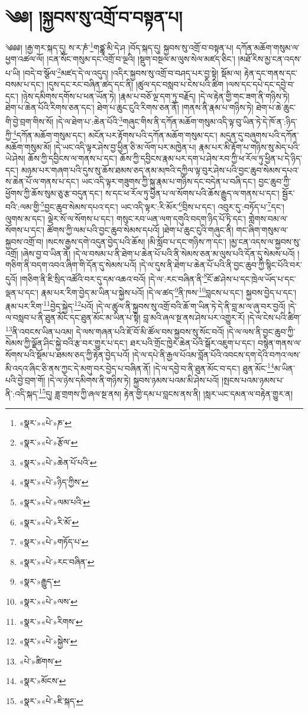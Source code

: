 \chapter{༄༅། །སྐྱབས་སུ་འགྲོ་བ་བསྟན་པ།}༄༅༅། །རྒྱ་གར་སྐད་དུ། ས་ར་ཎཾ་\footnote{«སྣར་»«པེ་»ཎ་}གཙྪཱ་མི་དེ་ཤ །བོད་སྐད་དུ། སྐྱབས་སུ་འགྲོ་བ་བསྟན་པ། དཀོན་མཆོག་གསུམ་ལ་ཕྱག་འཚལ་ལོ། །ངན་སོང་གསུམ་དང་འགྲོ་བ་ལྔའི། །སྡུག་བསྔལ་མ་ལུས་སེལ་མཛད་ཅིང་། །མཐོ་རིས་མྱ་ངན་འདས་པ་ཡི། །བདེ་བ་སྩོལ་\footnote{«སྣར་»«པེ་»རྩོལ་}མཛད་དེ་ལ་འདུད། །འདིར་སྐྱབས་སུ་འགྲོ་བ་བཤད་པར་བྱ་སྟེ། སྡོམ་ལ། རྟེན་དང་གནས་དང་བསམ་པ་དང་། །དུས་དང་རང་བཞིན་ཚད་དང་ནི། །ཚུལ་དང་བསླབ་པ་ངེས་པའི་ཚིག །ལས་དང་དཔེ་དང་དབྱེ་བ་དང་། །ཉེས་དམིགས་དགོས་པ་ཕན་ཡོན་ཏེ། །རྣམ་པ་བཅོ་ལྔ་དག་ཏུ་བརྗོད། །དེ་ལ་རྟེན་གྱི་གང་ཟག་ནི་གཉིས་ཏེ། ཐེག་པ་ཆེན་པོའི་རིགས་ཅན་དང་། ཐེག་པ་ཆུང་ངུའི་རིགས་ཅན་ནོ། །གནས་ནི་རྣམ་པ་གཉིས་ཏེ། ཐེག་པ་ཆེ་ཆུང་གི་བྱེ་བྲག་གིས་སོ། །དེ་ལ་ཐེག་པ་:ཆེན་པོའི་\footnote{«སྣར་»«པེ་»ཆེན་པོ་པའི་}གཞུང་གིས་ནི་དཀོན་མཆོག་གསུམ་འདི་ལྟ་བུ་ཡིན་ཏེ་དེ་ཁོ་ན་:ཉིད་ཀྱི་\footnote{«སྣར་»«པེ་»ཉིད་ཀྱིས་}དཀོན་མཆོག་གསུམ་དང་། མངོན་པར་རྟོགས་པའི་དཀོན་མཆོག་གསུམ་དང་། མདུན་དུ་བཞུགས་པའི་དཀོན་མཆོག་གསུམ་མོ། །དེ་ཡང་འདི་ལྟར་ཤེས་བྱ་ཕྱིན་ཅི་མ་ལོག་པར་མཁྱེན་པ། རྣམ་པར་མི་རྟོག་པ་གཉིས་སུ་མེད་པའི་ཡེ་ཤེས། ཆོས་ཀྱི་དབྱིངས་ལ་གནས་པ་དང་། ཆོས་ཀྱི་དབྱིངས་རྣམ་པར་དག་པ་ཤེས་རབ་ཀྱི་ཕ་རོལ་ཏུ་ཕྱིན་པ་དེ་ཉིད་དང་། མཉམ་པར་གཞག་པའི་དུས་སུ་ཆོས་ཐམས་ཅད་ནམ་མཁའི་དཀྱིལ་ལྟ་བུར་ཤེས་པའི་བྱང་ཆུབ་སེམས་དཔའ་ས་ཆེན་པོ་ལ་གནས་པ་དང་། ཡང་འདི་ལྟར་གཟུགས་ཀྱི་སྐུ་རྣམ་པ་གཉིས་དང་བདེན་པ་བཞི་དང་། བྱང་ཆུབ་ཀྱི་ཕྱོགས་ཀྱི་ཆོས་སུམ་ཅུ་རྩ་བདུན་དང་། ས་དང་ཕ་རོལ་ཏུ་ཕྱིན་པ་ལ་སོགས་པའི་ཆོས་རྒྱུད་ལ་གནས་པ་དང་། སྦྱོར་བའི་:ལམ་གྱི་\footnote{«སྣར་»«པེ་»ལམ་པའི་}བྱང་ཆུབ་སེམས་དཔའ་དང་། ཡང་འདི་ལྟར་:རི་མོར་\footnote{«སྣར་»«པེ་»རི་མོ་}བྲིས་པ་དང་། འབུར་དུ་:བཏོད་པ་\footnote{«སྣར་»«པེ་»གཏོད་པ་}དང་། ལུགས་མ་དང་། ལྡེར་སོ་ལ་སོགས་པ་དང་། གསུང་རབ་ཡན་ལག་དགུའི་བདག་ཉིད་པོ་ཏི་དང་། གླེགས་བམ་ལ་སོགས་པ་དང་། ཚོགས་ཀྱི་ལམ་པའི་བྱང་ཆུབ་སེམས་དཔའོ། །ཐེག་པ་ཆུང་ངུའི་གཞུང་ནི། གང་ཞིག་གསུམ་ལ་སྐྱབས་འགྲོ་བ། །སངས་རྒྱས་དགེ་འདུན་བྱེད་པའི་ཆོས། །མི་སློབ་པ་དང་གཉིས་ཀ་དང་། །མྱ་ངན་འདས་ལ་སྐྱབས་སུ་འགྲོ། །ཞེས་བྱ་བ་ཡིན་ནོ། །དེ་ལ་བསམ་པ་ནི་ཐེག་པ་ཆེན་པོ་པའི་ནི་སེམས་ཅན་མ་ལུས་པའི་དོན་དུ་སེམས་པའོ། །གཅིག་ནི་བདག་འབའ་ཞིག་གི་དོན་དུ་སེམས་པའོ། །དེ་ལ་དུས་ནི་ཐེག་པ་ཆེན་པོ་པའི་ནི་བྱང་ཆུབ་ཀྱི་སྙིང་པོའི་བར་དུའོ། །གཅིག་ནི་ཇི་སྲིད་འཚོའི་བར་དུ་དམ་འཆའ་བའོ། །དེ་ལ་:རང་བཞིན་ནི་\footnote{«སྣར་»«པེ་»རང་བཞིན་}ངོ་ཚ་ཤེས་པ་དང་ཁྲེལ་ཡོད་པ་དང་ལྡན་པ་དང་། རྣམ་པར་རིག་བྱེད་མ་ཡིན་པ་སྐྱེས་པའོ། །དེ་ལ་ཚད་\footnote{«སྣར་»རྒྱུད་}ནི་ཁས་\footnote{«སྣར་»«པེ་»ལས་}བླངས་པ་དང་། སྐྱབས་བྱེད་པ་དང་། རྣམ་པར་རིག་\footnote{«སྣར་»«པེ་»རིགས་}བྱེད་སྐྱེད་\footnote{«སྣར་»«པེ་»སྐྱེས་}པའོ། །དེ་ལ་ཚུལ་ནི་སྐྱབས་སུ་འགྲོ་བའི་ཆོ་ག་ཡིན་ཏེ་དེ་ནི་བླ་མ་ལ་ཞུ་བར་བྱའོ། །དེ་ལ་བསླབ་པ་ནི་ཐུན་མོང་དང་ཐུན་མོང་མ་ཡིན་པ་སྟེ། བླ་མའི་ཞལ་སྔ་ནས་ཤེས་པར་འགྱུར་རོ། །དེ་ལ་ངེས་པའི་ཚིག་\footnote{«པེ་»ཚིགས་}ནི་འབངས་ཡིན་པའམ། དེ་ལས་གཞན་པའི་ཇོ་བོ་མི་ཚོལ་བས་སྐྱབས་སུ་སོང་བའོ། །དེ་ལ་ལས་ནི་བྱང་ཆུབ་ཀྱི་སེམས་ཀྱི་ལྗོན་ཤིང་སྐྱེ་བའི་རྩ་བར་གྱུར་པ་དང་། ཐར་པའི་གྲོང་ཁྱེར་ཆེན་པོའི་སྒོར་འཇུག་པ་དང་། བསྙེན་གནས་ལ་སོགས་པའི་སྡོམ་པ་ཐམས་ཅད་ཀྱི་རྟེན་བྱེད་པའོ། །དེ་ལ་དཔེ་ནི་རྒྱལ་པོའམ་བློན་པོའི་འབངས་དག་དེའི་བཀའ་ལས་མི་འདའ་ཞིང་ཅི་ནས་ཀྱང་དེ་མགུ་བར་བྱེད་པ་བཞིན་ནོ། །དེ་ལ་དབྱེ་བ་ནི་ཐུན་མོང་བ་དང་། ཐུན་མོང་\footnote{«སྣར་»མོངས་}མ་ཡིན་པའི་བྱེ་བྲག་གོ། །དེ་ལ་ཉེས་དམིགས་ནི་གཉིས་ཏེ། སྐྱབས་ཉམས་པའམ་མི་ཤེས་པའོ། །སྤངས་པའམ་ཉམས་པ་ནི་:འདི་སྐད་\footnote{«སྣར་»«པེ་»ཇི་སྐད་}དུ། ཟླ་གྲགས་ཀྱི་ཞལ་སྔ་ནས། རྟེན་གྱི་དམ་པ་བླངས་ནས་ནི། །སླར་ཡང་དམན་ལ་བརྟེན་གྱུར་ན། 
